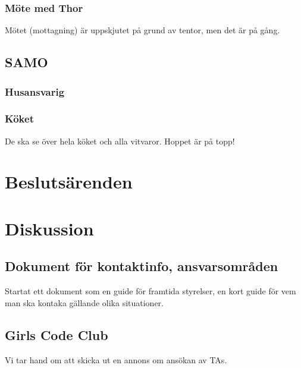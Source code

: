 \documentclass[protokoll]{dvd}
\begin{document}
       \subsubsection*{Möte med Thor}
       Mötet (mottagning) är uppskjutet på grund av tentor, men det är på gång.

   \subsection*{SAMO} 

       \subsubsection*{Husansvarig}

       \subsubsection*{Köket}
       De ska se över hela köket och alla vitvaror. Hoppet är på topp!


\newpage

\section{Beslutsärenden}

\section{Diskussion}

    \subsection*{Dokument för kontaktinfo, ansvarsområden}
    Startat ett dokument som en guide för framtida styrelser, en kort guide för vem man ska kontaka gällande olika situationer.

    \subsection*{Girls Code Club}
    Vi tar hand om att skicka ut en annons om ansökan av TAs. 
\end{document}
